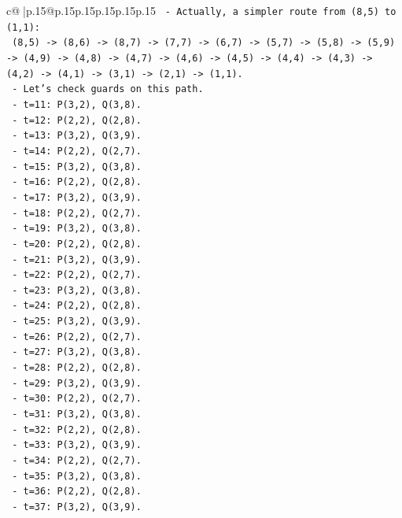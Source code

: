\documentclass{article}
\begin{document}
{\begin{supertabular}{c@{$\;$}|p{.15\linewidth}@{}p{.15\linewidth}p{.15\linewidth}p{.15\linewidth}p{.15\linewidth}p{.15\linewidth}}
{{{\texttt{   {-} Actually, a simpler route from (8,5) to (1,1):} \\
\texttt{     (8,5) {-}> (8,6) {-}> (8,7) {-}> (7,7) {-}> (6,7) {-}> (5,7) {-}> (5,8) {-}> (5,9) {-}> (4,9) {-}> (4,8) {-}> (4,7) {-}> (4,6) {-}> (4,5) {-}> (4,4) {-}> (4,3) {-}> (4,2) {-}> (4,1) {-}> (3,1) {-}> (2,1) {-}> (1,1).} \\
\texttt{   {-} Let's check guards on this path.} \\
\texttt{   {-} t=11: P(3,2), Q(3,8).} \\
\texttt{   {-} t=12: P(2,2), Q(2,8).} \\
\texttt{   {-} t=13: P(3,2), Q(3,9).} \\
\texttt{   {-} t=14: P(2,2), Q(2,7).} \\
\texttt{   {-} t=15: P(3,2), Q(3,8).} \\
\texttt{   {-} t=16: P(2,2), Q(2,8).} \\
\texttt{   {-} t=17: P(3,2), Q(3,9).} \\
\texttt{   {-} t=18: P(2,2), Q(2,7).} \\
\texttt{   {-} t=19: P(3,2), Q(3,8).} \\
\texttt{   {-} t=20: P(2,2), Q(2,8).} \\
\texttt{   {-} t=21: P(3,2), Q(3,9).} \\
\texttt{   {-} t=22: P(2,2), Q(2,7).} \\
\texttt{   {-} t=23: P(3,2), Q(3,8).} \\
\texttt{   {-} t=24: P(2,2), Q(2,8).} \\
\texttt{   {-} t=25: P(3,2), Q(3,9).} \\
\texttt{   {-} t=26: P(2,2), Q(2,7).} \\
\texttt{   {-} t=27: P(3,2), Q(3,8).} \\
\texttt{   {-} t=28: P(2,2), Q(2,8).} \\
\texttt{   {-} t=29: P(3,2), Q(3,9).} \\
\texttt{   {-} t=30: P(2,2), Q(2,7).} \\
\texttt{   {-} t=31: P(3,2), Q(3,8).} \\
\texttt{   {-} t=32: P(2,2), Q(2,8).} \\
\texttt{   {-} t=33: P(3,2), Q(3,9).} \\
\texttt{   {-} t=34: P(2,2), Q(2,7).} \\
\texttt{   {-} t=35: P(3,2), Q(3,8).} \\
\texttt{   {-} t=36: P(2,2), Q(2,8).} \\
\texttt{   {-} t=37: P(3,2), Q(3,9).} \\
}}}
\end{supertabular}}
\end{document}
